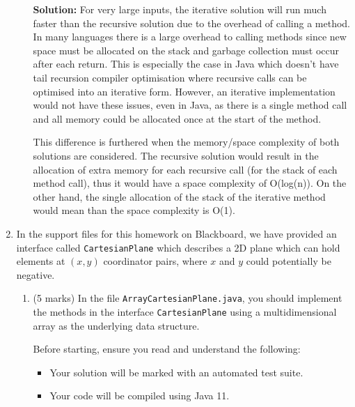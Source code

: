 \documentclass[a4,13pt]{extarticle}
\newenvironment{Solution}{\color{blue}\textbf{Solution:}}{}
\begin{document}
\begin{enumerate}
\begin{enumerate}
			\begin{Solution}
				For very large inputs, the iterative solution will run much faster than the recursive solution due to the overhead of calling a method. In many languages there is a large overhead to calling methods since new space must be allocated on the stack and garbage collection must occur after each return. This is especially the case in Java which doesn't have tail recursion compiler optimisation where recursive calls can be optimised into an iterative form. However, an iterative implementation would not have these issues, even in Java, as there is a single method call and all memory could be allocated once at the start of the method.

				This difference is furthered when the memory/space complexity of both solutions are considered. The recursive solution would result in the allocation of extra memory for each recursive call (for the stack of each method call), thus it would have a space complexity of O(log(n)). On the other hand, the single allocation of the stack of the iterative method would mean than the space complexity is O(1).
	      	\end{Solution}
	      \end{enumerate}
	      	              
	      \newpage 
	      	          
	\item
	      In the support files for this homework on Blackboard, we have provided an interface called \texttt{CartesianPlane} which describes a 2D plane which can hold elements at $(x,y)$ coordinator pairs, where $x$ and $y$ could potentially be negative. 
	      \begin{enumerate}
	      	\item (5 marks) In the file \texttt{ArrayCartesianPlane.java}, you should implement the methods in the interface \texttt{CartesianPlane} using a multidimensional array as the underlying data structure.
	      	      	      	                      
	      	      Before starting, ensure you read and understand the following:
	      	      \begin{itemize}
	      	      		      	      	
	      	      	\item Your solution will be marked with an automated test suite. 
	      	      	      	      	      	                          
	      	      	\item Your code will be compiled using Java 11.
	      	      	      	      	      	                          

\end{itemize}
\end{enumerate}
\end{enumerate}
\end{document}
